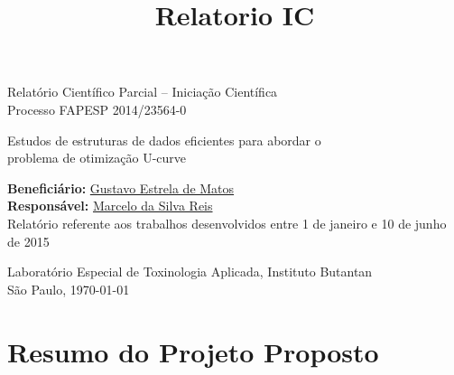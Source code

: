 \documentclass[12pt]{article}
\title{Relatorio IC}
\begin{document}
%
\doublespacing

\begin{titlepage}
	\vfill 
	\begin{center}
        {\Large Relatório Científico Parcial -- Iniciação Científica\\
         \bigskip
         Processo FAPESP 2014/23564-0
        }
        
        \bigskip
    
  		{\LARGE Estudos de estruturas de dados eficientes para abordar o\\
    	\bigskip
    	problema de otimização U-curve}

        \bigskip
  		\bigskip
  		{\Large {\bf Beneficiário:} \href{mailto:gustavo.estrela.matos@usp.br}{Gustavo Estrela de Matos}\\ 
        
  		{\bf Responsável:} \href{mailto:marcelo.reis@butantan.gov.br}{Marcelo da Silva Reis}\\

        \bigskip
        \bigskip
        \bigskip
  		\bigskip
        \bigskip
  		\bigskip
        \bigskip
Relatório referente aos trabalhos desenvolvidos entre 1 de janeiro e 10 de junho de 2015

        \bigskip
        \bigskip
        \bigskip
  		\bigskip
        \bigskip
  		\bigskip
        \bigskip

Laboratório Especial de Toxinologia Aplicada, Instituto Butantan\\
        \bigskip
  		São Paulo, \today\\
  		}

  		\bigskip
        \bigskip

       

\end{center}
\end{titlepage}


\tableofcontents

\pagebreak



\section{Resumo do Projeto Proposto} \label{sec:resumo} %


\end{document}
